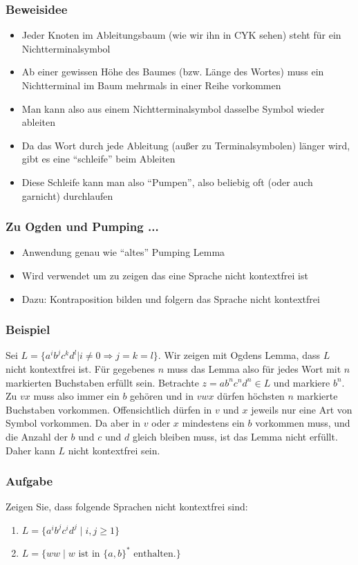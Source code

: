 \documentclass{beamer}
\begin{document}
{\begin{frame}
\frametitle{Beweisidee}
\begin{itemize}
\item Jeder Knoten im Ableitungsbaum (wie wir ihn in CYK sehen) steht für ein Nichtterminalsymbol
\item Ab einer gewissen Höhe des Baumes (bzw. Länge des Wortes) muss ein Nichtterminal im Baum mehrmals in einer Reihe vorkommen
\item Man kann also aus einem Nichtterminalsymbol dasselbe Symbol wieder ableiten
\item Da das Wort durch jede Ableitung (außer zu Terminalsymbolen) länger wird, gibt es eine ``schleife'' beim Ableiten
\item Diese Schleife kann man also ``Pumpen'', also beliebig oft (oder auch garnicht) durchlaufen
\end{itemize}
\end{frame}

\begin{frame}
\frametitle{Zu Ogden und Pumping ...}
\begin{itemize}
\item Anwendung genau wie ``altes'' Pumping Lemma
\item Wird verwendet um zu zeigen das eine Sprache nicht kontextfrei ist
\item Dazu: Kontraposition bilden und folgern das Sprache nicht kontextfrei
\end{itemize}
\end{frame}

\begin{frame}
\frametitle{Beispiel}
Sei $L = \{a^ib^jc^kd^l | i \neq 0 \Rightarrow j = k = l\}$. Wir zeigen mit Ogdens Lemma, dass $L$ nicht kontextfrei ist.
Für gegebenes $n$ muss das Lemma also für jedes Wort mit $n$ markierten Buchstaben erfüllt sein. Betrachte $z = ab^nc^nd^n \in L$ und markiere $b^n$.
Zu $vx$ muss also immer ein $b$ gehören und in $vwx$ dürfen höchsten $n$ markierte Buchstaben vorkommen. Offensichtlich dürfen in $v$ und $x$ jeweils nur eine Art von Symbol vorkommen. Da aber in $v$ oder $x$ mindestens ein $b$ vorkommen muss, und die Anzahl der $b$ und $c$ und $d$ gleich bleiben muss, ist das Lemma nicht erfüllt. Daher kann $L$ nicht kontextfrei sein.
\end{frame}

\begin{frame}
\frametitle{Aufgabe}
Zeigen Sie, dass folgende Sprachen nicht kontextfrei sind:
\begin{enumerate}
 \item $L=\{a^ib^jc^id^j \mid i,j \geq 1 \}$
 \item $L=\{ww \mid w \text{ ist in }\{a, b\}^* \text{ enthalten.}\}$
\end{enumerate}
\end{frame}

}
\end{document}
